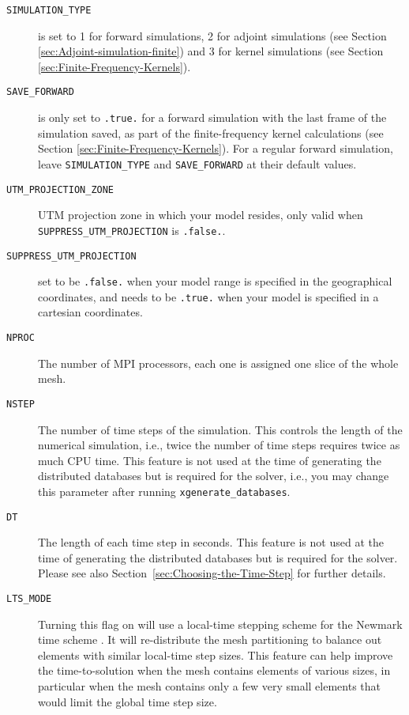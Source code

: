 \begin{description}
\item [{\texttt{SIMULATION\_TYPE}}] is set to 1 for forward simulations,
2 for adjoint simulations (see Section \ref{sec:Adjoint-simulation-finite})
and 3 for kernel simulations (see Section \ref{sec:Finite-Frequency-Kernels}).
\item [{\texttt{SAVE\_FORWARD}}] is only set to \texttt{.true.} for a forward
simulation with the last frame of the simulation saved, as part of
the finite-frequency kernel calculations (see Section \ref{sec:Finite-Frequency-Kernels}).
For a regular forward simulation, leave \texttt{SIMULATION\_TYPE}
and \texttt{SAVE\_FORWARD} at their default values.
\item [{\texttt{UTM\_PROJECTION\_ZONE}}] UTM projection zone in
which your model resides, only valid when \texttt{SUPPRESS\_UTM\_PROJECTION} is \texttt{.false.}.
\item [{\texttt{SUPPRESS\_UTM\_PROJECTION}}] set to be \texttt{.false.}
when your model range is specified in the geographical coordinates,
and needs to be \texttt{.true.} when your model is specified in a
cartesian coordinates. 
\item [{\texttt{NPROC}}] The number of MPI processors, each one is assigned
one slice of the whole mesh.
\item [{\texttt{NSTEP}}] The number of time steps of the simulation. This
controls the length of the numerical simulation, i.e., twice the number
of time steps requires twice as much CPU time. This feature is not
used at the time of generating the distributed databases but is required
for the solver, i.e., you may change this parameter after running
\texttt{xgenerate\_databases}.
\item [{\texttt{DT}}] The length of each time step in seconds. This feature
is not used at the time of generating the distributed databases but
is required for the solver. Please see also Section~\ref{sec:Choosing-the-Time-Step}
for further details.
\item [{\texttt{LTS\_MODE}}] Turning this flag on will use a local-time stepping scheme for the Newmark time scheme \citep{Rietmann2015,Rietmann2016}.
It will re-distribute the mesh partitioning to balance out elements with similar local-time step sizes.
This feature can help improve the time-to-solution when the mesh contains elements of various sizes,
in particular when the mesh contains only a few very small elements that would limit the global time step size.

\end{description}

